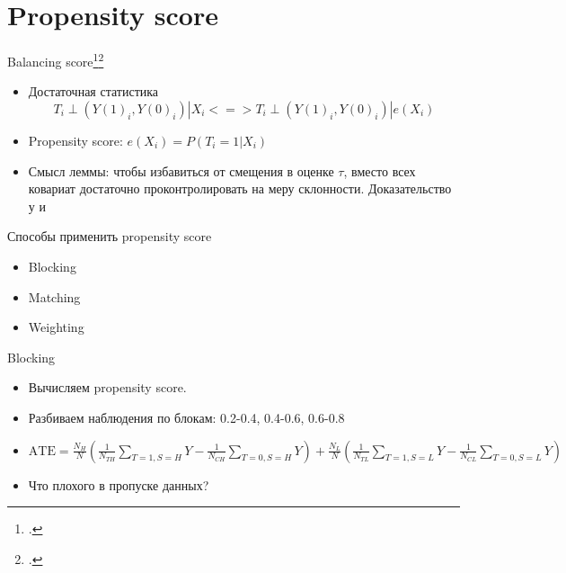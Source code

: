 
\section{Propensity score}




\begin{frame}{Balancing score\footcite[Можно почитать у][]{enikolopov2009ecm}\footcitetext[Раздел 3.3]{angrist2008mostly}}
\begin{itemize}
    \item Достаточная статистика
    $$T_i \perp (Y(1)_i, Y(0)_i)| X_i <=> T_i \perp (Y(1)_i, Y(0)_i)  | e(X_i)$$
    \item Propensity score:
    $e(X_i)=P(T_i = 1 | X_i)$
    \item Смысл леммы: чтобы избавиться от смещения в оценке $\tau$, вместо всех ковариат достаточно проконтролировать на  меру склонности. Доказательство у \textcite[Глава 15]{imbens2015causal} и \textcite{rubin1978bayesian}
    \end{itemize}
\end{frame}

\begin{frame}{Способы применить propensity score}
\begin{itemize}
    \item Blocking
    \item Matching
    \item Weighting
\end{itemize}
\end{frame}

\begin{frame}{Blocking}
\begin{itemize}
    \item Вычисляем propensity score.
    \item Разбиваем наблюдения по блокам: 0.2-0.4, 0.4-0.6, 0.6-0.8
    \item $\text{ATE} = \frac{N_H}{N} \left(\frac{1}{N_{TH}}\sum_{T=1, S=H} Y - \frac{1}{N_{CH}}\sum_{T=0,S=H} Y \right)+ 
\frac{N_L}{N} \left(\frac{1}{N_{TL}}\sum_{T=1, S=L} Y - \frac{1}{N_{CL}}\sum_{T=0,S=L} Y \right)$
\end{itemize}

\begin{itemize}
    \item Что плохого в пропуске данных?
\end{itemize}
\end{frame}

